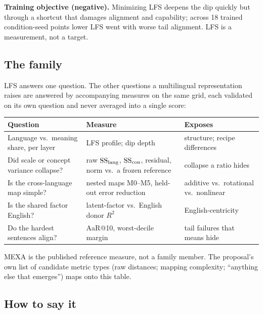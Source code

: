 \textbf{Training objective (negative).} Minimizing LFS deepens the dip
quickly but through a shortcut that damages alignment and capability; across
18 trained condition-seed points lower LFS went with worse tail alignment. LFS is a
measurement, not a target.

\subsection{The family}

LFS answers one question. The other questions a multilingual representation
raises are answered by accompanying measures on the same grid, each validated on
its own question and never averaged into a single score:

\begin{center}\small
\begin{tabular}{p{4.6cm}p{5.2cm}p{4.6cm}}
\toprule
Question & Measure & Exposes \\
\midrule
Language vs.\ meaning share, per layer & LFS profile; dip depth & structure; recipe differences \\
Did scale or concept variance collapse? & raw $\mathrm{SS}_{\mathrm{lang}}$, $\mathrm{SS}_{\mathrm{con}}$, residual, norm vs.\ a frozen reference & collapse a ratio hides \\
Is the cross-language map simple? & nested maps M0--M5, held-out error reduction & additive vs.\ rotational vs.\ nonlinear \\
Is the shared factor English? & latent-factor vs.\ English donor $R^2$ & English-centricity \\
Do the hardest sentences align? & AaR@10, worst-decile margin & tail failures that means hide \\
\bottomrule
\end{tabular}
\end{center}

MEXA is the published reference measure, not a family member. The proposal's own list
of candidate metric types (raw distances; mapping complexity; ``anything else
that emerges'') maps onto this table.

\subsection{How to say it}


